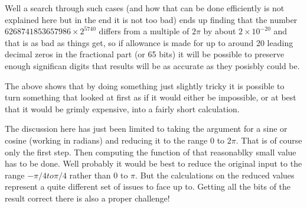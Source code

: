 Well a search through such cases (and how that can be done efficiently is
not explained here but in the end it is not too bad) ends up finding that the
number $6268741853657986 \times 2^{5740}$ differs from a multiple of
$2 \pi$ by about $2\times 10^{-20}$ and that is as bad as things get, so
if allowance is made for up to around 20 leading decimal zeros in the
fractional part (or 65 bits) it will be possible to preserve enough
significan digits that results will be as accurate as they posisbly could be.

The above shows that by doing something just slightly tricky it is possible
to turn something that looked at first as if it would either be impossible,
or at best that it would be grimly expensive, into a fairly short calculation.

The discussion here has just been limited to taking the argument for a
sine or cosine (working in radians) and reducing it to the range $0$ to
$2 \pi$. That is of course only the first step. Then computing
the function of that reasonablky small value has to be done. Well probably
it would be best to reduce the original input to the range $-\pi/4 to
\pi/4$ rather than $0$ to $\pi$. But the calculations on the reduced
values represent a quite different set of issues to face up to.
Getting all the bits of the result correct there is also a proper
challenge!



